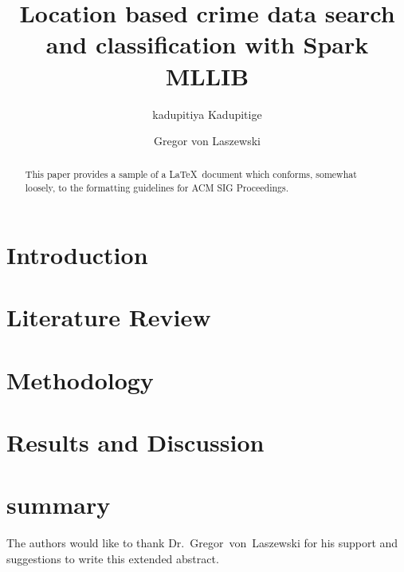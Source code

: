 
\title{Location based crime data search and classification with Spark MLLIB}


\author{kadupitiya Kadupitige}

\author{Gregor von Laszewski}


\renewcommand{\shortauthors}{G. v. Laszewski}


\begin{abstract}
This paper provides a sample of a \LaTeX\ document which conforms,
somewhat loosely, to the formatting guidelines for
ACM SIG Proceedings.
\end{abstract}



\maketitle



\section{Introduction}


\section{Literature Review}

\section{Methodology}

\section{Results and Discussion}

\section{summary} 

\begin{acks}
	
	The authors would like to thank Dr.~Gregor~von~Laszewski for his support and
	suggestions to write this extended abstract.
	
\end{acks}


 